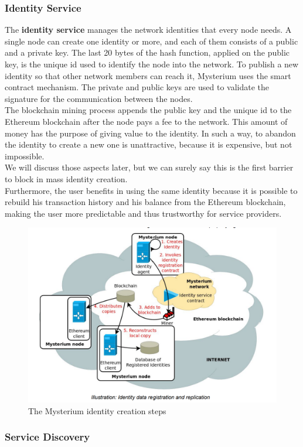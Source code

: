 \documentclass[]{article}
\begin{document}
	\subsubsection{Identity Service}

	The \textbf{identity service} manages the network identities that every node needs. A single node can create one identity or more, and each of them consists of a public and a private key. The last 20 bytes of the hash function, applied on the public key, is the unique id used to identify the node into the network. To publish a new identity so that other network members can reach it, Mysterium uses the smart contract mechanism. The private and public keys are used to validate the signature for the communication between the nodes.\\
	The blockchain mining process appends the public key and the unique id to the Ethereum blockchain after the node pays a fee to the network. This amount of money has the purpose of giving value to the identity. In such a way,  to abandon the identity to create a new one is unattractive, because it is expensive, but not impossible.\\ 
	We will discuss those aspects later, but we can surely say this is the first barrier to block in mass identity creation.\\
	Furthermore, the user benefits in using the same identity because it is possible to rebuild his transaction history and his balance from the Ethereum blockchain, making the user more predictable and thus trustworthy for service providers.\\

	\begin{figure}
		\includegraphics[width=0.5\linewidth]{"images/mysterium_identity_creation.png"}
		\caption{The Mysterium identity creation steps}
	\end{figure}

	\subsubsection{Service Discovery}
\end{document}
